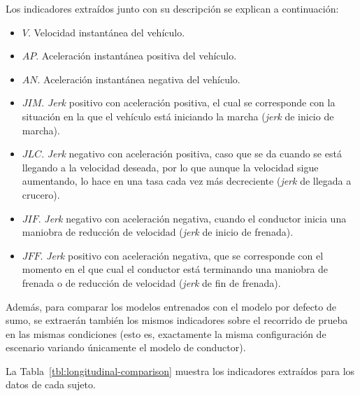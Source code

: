 Los indicadores extraídos junto con su descripción se explican a continuación:

\begin{itemize}
	\item $V$. Velocidad instantánea del vehículo.
	\item $AP$. Aceleración instantánea positiva del vehículo.
	\item $AN$. Aceleración instantánea negativa del vehículo.
	\item $JIM$. \textit{Jerk} positivo con aceleración positiva, el cual se corresponde con la situación en la que el vehículo está iniciando la marcha (\textit{jerk} de inicio de marcha).
	\item $JLC$. \textit{Jerk} negativo con aceleración positiva, caso que se da cuando se está llegando a la velocidad deseada, por lo que aunque la velocidad sigue aumentando, lo hace en una tasa cada vez más decreciente (\textit{jerk} de llegada a crucero).
	\item $JIF$. \textit{Jerk} negativo con aceleración negativa, cuando el conductor inicia una maniobra de reducción de velocidad (\textit{jerk} de inicio de frenada).
	\item $JFF$. \textit{Jerk} positivo con aceleración negativa, que se corresponde con el momento en el que cual el conductor está terminando una maniobra de frenada o de reducción de velocidad (\textit{jerk} de fin de frenada).
\end{itemize}

Además, para comparar los modelos entrenados con el modelo por defecto de \gls{sumo}, se extraerán también los mismos indicadores sobre el recorrido de prueba en las mismas condiciones (esto es, exactamente la misma configuración de escenario variando únicamente el modelo de conductor).

La Tabla~\ref{tbl:longitudinal-comparison} muestra los indicadores extraídos para los datos de cada sujeto.


